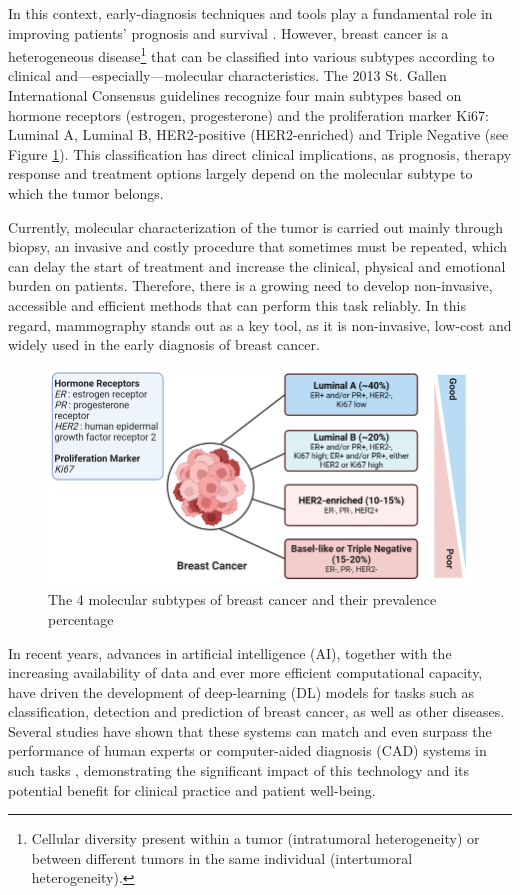 \documentclass[a4paper,10pt]{book}
\begin{document}
In this context, early-diagnosis techniques and tools play a fundamental role in improving patients’ prognosis and survival \cite{wang_early_2017}. However, breast cancer is a heterogeneous disease\footnote{Cellular diversity present within a tumor (intratumoral heterogeneity) or between different tumors in the same individual (intertumoral heterogeneity).} that can be classified into various subtypes according to clinical and—especially—molecular characteristics. The 2013 St. Gallen International Consensus guidelines \cite{goldhirsch_personalizing_2013} recognize four main subtypes based on hormone receptors (estrogen, progesterone) and the proliferation marker Ki67: Luminal A, Luminal B, HER2-positive (HER2-enriched) and Triple Negative (see Figure \ref{fig:subtypes}). This classification has direct clinical implications, as prognosis, therapy response and treatment options largely depend on the molecular subtype to which the tumor belongs.

Currently, molecular characterization of the tumor is carried out mainly through biopsy, an invasive and costly procedure that sometimes must be repeated, which can delay the start of treatment and increase the clinical, physical and emotional burden on patients. Therefore, there is a growing need to develop non-invasive, accessible and efficient methods that can perform this task reliably. In this regard, mammography stands out as a key tool, as it is non-invasive, low-cost and widely used in the early diagnosis of breast cancer.

\begin{figure}
	\centering
	\includegraphics[width=0.8\linewidth]{reports/assets/subtypes.png}
	\caption{The 4 molecular subtypes of breast cancer and their prevalence percentage \cite{harnessing_2024}}
	\label{fig:subtypes}
\end{figure}

In recent years, advances in artificial intelligence (AI), together with the increasing availability of data and ever more efficient computational capacity, have driven the development of deep-learning (DL) models for tasks such as classification, detection and prediction of breast cancer, as well as other diseases. Several studies have shown that these systems can match and even surpass the performance of human experts or computer-aided diagnosis (CAD) systems in such tasks \cite{mckinney_international_2020,pattanaik_breast_2022,meenalochini_deep_2024,hussain_performance_2025}, demonstrating the significant impact of this technology and its potential benefit for clinical practice and patient well-being.
\end{document}
